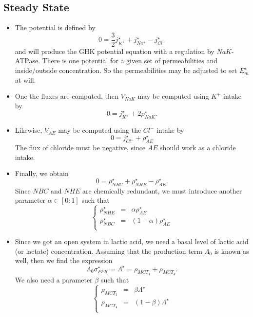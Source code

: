 \documentclass{revtex4}
\begin{document}
\subsection{Steady State}
\begin{itemize}
\item
The potential is defined by
\begin{equation}
	0 = \dfrac{3}{2}j_{K^+}^\star + j_{Na^+}^\star - j_{Cl^-}^\star
\end{equation}
and will produce the GHK potential equation with a regulation by $NaK$-ATPase.
There is one potential for a given set of permeabilities and inside/outside concentration.
So the permeabilities may be adjusted to set $E_m^\star$ at will.
\item One the fluxes are computed, then $V_{NaK}$ may be computed using $K^+$ intake by
	\begin{equation}
		0 = j_{K^+}^\star + 2 \rho_{NaK}^\star.
	\end{equation}
\item Likewise, $V_{AE}$ may be computed using the $Cl^-$ intake by
	\begin{equation}
		0 = j_{Cl^-}^\star + \rho_{AE}^\star
	\end{equation}
	The flux of chloride must be negative, since $AE$ should work as a chloride intake.
\item Finally, we obtain
\begin{equation}
	0 = \rho_{NBC}^\star+\rho_{NHE}^\star - \rho_{AE}^\star.
\end{equation}
Since $NBC$ and $NHE$ are chemically redundant, we must introduce another parameter $\alpha\in[0:1]$
such that 
\begin{equation}
	\left\lbrace
	\begin{array}{rcr}
	\rho_{NHE}^\star & = & \alpha \rho_{AE}^\star\\
	\rho_{NBC}^\star & = & (1-\alpha) \rho_{AE}^\star\\ 
	\end{array}
	\right.
\end{equation}


\item Since we got an open system in lactic acid, we need a basal level of lactic acid (or lactate) concentration.
Assuming that the production term $\Lambda_0$ is known as well, then we find the expression
\begin{equation}
	\Lambda_0 \sigma_{PFK}^\star = \Lambda^\star = \rho_{MCT_1} + \rho_{MCT_4}.
\end{equation}
We also need a parameter $\beta$ such that
\begin{equation}
	\left\lbrace
	\begin{array}{rcr}
	\rho_{MCT_1} & = & \beta \Lambda^\star\\
	\rho_{MCT_4} & = & (1-\beta) \Lambda^\star\\
	\end{array}
	\right.
\end{equation}

\end{itemize}
\end{document}

